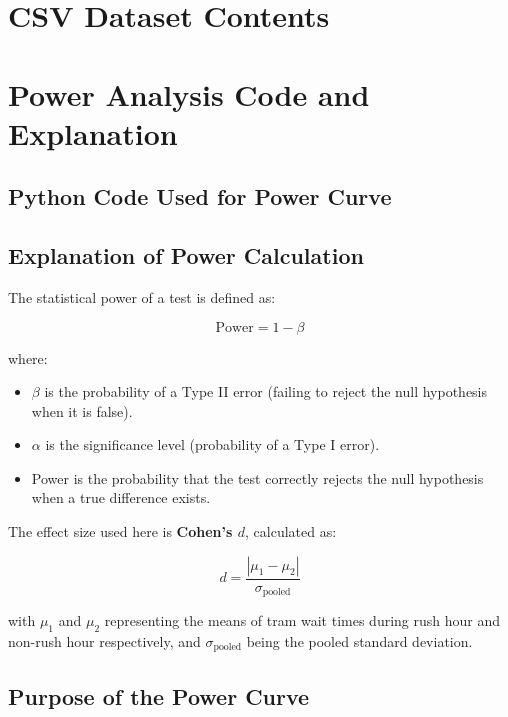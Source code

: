 \documentclass[a4paper, 10pt]{article}
\begin{document}
	\newpage
	\begin{appendices}
		\section{CSV Dataset Contents}
		\label{sec:rawdata}
		

		\newpage
		\section{Power Analysis Code and Explanation}
		\label{sec:power_analysis}

		\subsection*{Python Code Used for Power Curve}
				

			\subsection*{Explanation of Power Calculation}

				The statistical power of a test is defined as:

				\[
				\text{Power} = 1 - \beta
				\]

				where:
				\begin{itemize}
						\item \( \beta \) is the probability of a Type II error (failing to reject the null hypothesis when it is false).
						\item \( \alpha \) is the significance level (probability of a Type I error).
						\item Power is the probability that the test correctly rejects the null hypothesis when a true difference exists.
				\end{itemize}

				The effect size used here is \textbf{Cohen's \( d \)}, calculated as:

				\[
				d = \frac{|\mu_1 - \mu_2|}{\sigma_{\text{pooled}}}
				\]

				with \( \mu_1 \) and \( \mu_2 \) representing the means of tram wait times during rush hour and non-rush hour respectively, and \( \sigma_{\text{pooled}} \) being the pooled standard deviation.

			\subsection*{Purpose of the Power Curve}


\end{appendices}
\end{document}
